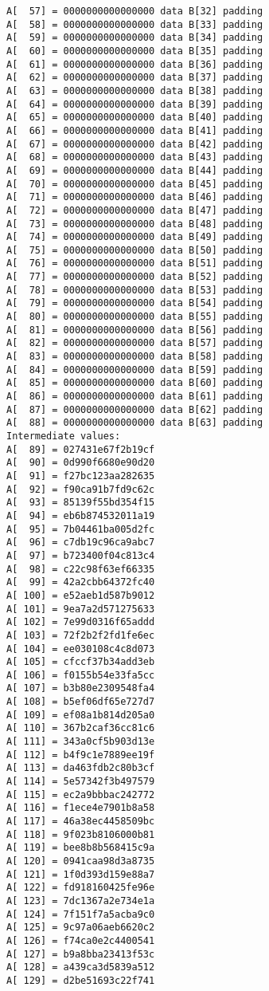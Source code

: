 \begin{verbatim}
A[  57] = 0000000000000000 data B[32] padding
A[  58] = 0000000000000000 data B[33] padding
A[  59] = 0000000000000000 data B[34] padding
A[  60] = 0000000000000000 data B[35] padding
A[  61] = 0000000000000000 data B[36] padding
A[  62] = 0000000000000000 data B[37] padding
A[  63] = 0000000000000000 data B[38] padding
A[  64] = 0000000000000000 data B[39] padding
A[  65] = 0000000000000000 data B[40] padding
A[  66] = 0000000000000000 data B[41] padding
A[  67] = 0000000000000000 data B[42] padding
A[  68] = 0000000000000000 data B[43] padding
A[  69] = 0000000000000000 data B[44] padding
A[  70] = 0000000000000000 data B[45] padding
A[  71] = 0000000000000000 data B[46] padding
A[  72] = 0000000000000000 data B[47] padding
A[  73] = 0000000000000000 data B[48] padding
A[  74] = 0000000000000000 data B[49] padding
A[  75] = 0000000000000000 data B[50] padding
A[  76] = 0000000000000000 data B[51] padding
A[  77] = 0000000000000000 data B[52] padding
A[  78] = 0000000000000000 data B[53] padding
A[  79] = 0000000000000000 data B[54] padding
A[  80] = 0000000000000000 data B[55] padding
A[  81] = 0000000000000000 data B[56] padding
A[  82] = 0000000000000000 data B[57] padding
A[  83] = 0000000000000000 data B[58] padding
A[  84] = 0000000000000000 data B[59] padding
A[  85] = 0000000000000000 data B[60] padding
A[  86] = 0000000000000000 data B[61] padding
A[  87] = 0000000000000000 data B[62] padding
A[  88] = 0000000000000000 data B[63] padding
Intermediate values:
A[  89] = 027431e67f2b19cf
A[  90] = 0d990f6680e90d20
A[  91] = f27bc123aa282635
A[  92] = f90ca91b7fd9c62c
A[  93] = 85139f55bd354f15
A[  94] = eb6b874532011a19
A[  95] = 7b04461ba005d2fc
A[  96] = c7db19c96ca9abc7
A[  97] = b723400f04c813c4
A[  98] = c22c98f63ef66335
A[  99] = 42a2cbb64372fc40
A[ 100] = e52aeb1d587b9012
A[ 101] = 9ea7a2d571275633
A[ 102] = 7e99d0316f65addd
A[ 103] = 72f2b2f2fd1fe6ec
A[ 104] = ee030108c4c8d073
A[ 105] = cfccf37b34add3eb
A[ 106] = f0155b54e33fa5cc
A[ 107] = b3b80e2309548fa4
A[ 108] = b5ef06df65e727d7
A[ 109] = ef08a1b814d205a0
A[ 110] = 367b2caf36cc81c6
A[ 111] = 343a0cf5b903d13e
A[ 112] = b4f9c1e7889ee19f
A[ 113] = da463fdb2c80b3cf
A[ 114] = 5e57342f3b497579
A[ 115] = ec2a9bbbac242772
A[ 116] = f1ece4e7901b8a58
A[ 117] = 46a38ec4458509bc
A[ 118] = 9f023b8106000b81
A[ 119] = bee8b8b568415c9a
A[ 120] = 0941caa98d3a8735
A[ 121] = 1f0d393d159e88a7
A[ 122] = fd918160425fe96e
A[ 123] = 7dc1367a2e734e1a
A[ 124] = 7f151f7a5acba9c0
A[ 125] = 9c97a06aeb6620c2
A[ 126] = f74ca0e2c4400541
A[ 127] = b9a8bba23413f53c
A[ 128] = a439ca3d5839a512
A[ 129] = d2be51693c22f741

\end{verbatim}
